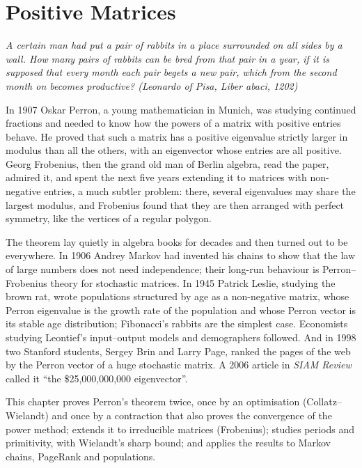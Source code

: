 \chapter{Positive Matrices}\label{linear:ch:perron}

\begin{center}\itshape
A certain man had put a pair of rabbits in a place surrounded on all sides by a wall. How many pairs of rabbits can be
bred from that pair in a year, if it is supposed that every month each pair begets a new pair, which from the second
month on becomes productive?
\upshape(Leonardo of Pisa, \emph{Liber abaci}, 1202)
\end{center}

In 1907 Oskar Perron, a young mathematician in Munich, was studying continued fractions and needed to know how the
powers of a matrix with positive entries behave. He proved that such a matrix has a positive eigenvalue strictly larger
in modulus than all the others, with an eigenvector whose entries are all positive. Georg Frobenius, then the grand old
man of Berlin algebra, read the paper, admired it, and spent the next five years extending it to matrices with
non-negative entries, a much subtler problem: there, several eigenvalues may share the largest modulus, and Frobenius
found that they are then arranged with perfect symmetry, like the vertices of a regular polygon.

The theorem lay quietly in algebra books for decades and then turned out to be everywhere. In 1906 Andrey Markov had
invented his chains to show that the law of large numbers does not need independence; their long-run behaviour is
Perron--Frobenius theory for stochastic matrices. In 1945 Patrick Leslie, studying the brown rat, wrote populations
structured by age as a non-negative matrix, whose Perron eigenvalue is the growth rate of the population and whose Perron
vector is its stable age distribution; Fibonacci's rabbits are the simplest case. Economists studying Leontief's input--output models and demographers followed. And in 1998 two Stanford students, Sergey Brin and Larry Page, ranked the pages of the
web by the Perron vector of a huge stochastic matrix. A 2006 article in \emph{SIAM Review} called it ``the
\$25{,}000{,}000{,}000 eigenvector''.

This chapter proves Perron's theorem twice, once by an optimisation (Collatz--Wielandt) and once by a contraction that also
proves the convergence of the power method; extends it to irreducible matrices (Frobenius); studies periods and
primitivity, with Wielandt's sharp bound; and applies the results to Markov chains, PageRank and populations.

